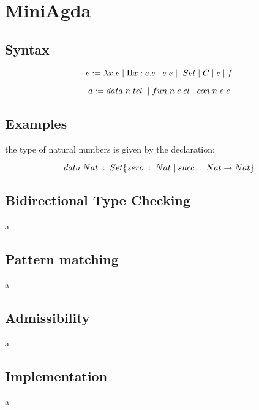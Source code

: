 \chapter{MiniAgda}
\section{Syntax}

\[ e := \lambda x . e \;\vert\; \Pi x : e . e \;\vert\; e \; e \;\vert\; \ Set \;\vert\; C \;\vert\; c \;\vert\; f \]

\[ d := data \; n \; tel \; \;\vert\; fun \; n \; e \; cl \;\vert\; con \; n \; e \; e  \]


\section{Examples}

the type of natural numbers is given by the declaration:

\[ data \; Nat \; : \; Set \{ zero \; : \; Nat \;\vert\; succ \; : \; Nat \rightarrow Nat \} \]

\section{Bidirectional Type Checking}
a
\section{Pattern matching}
a
\section{Admissibility}
a
\section{Implementation}
a

